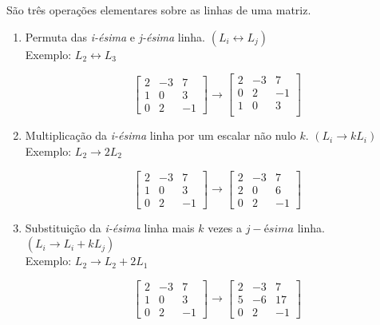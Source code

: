 \documentclass[oneside,a4paper,12pt]{article}
\begin{document}
São três operações elementares sobre as linhas de uma matriz.
\begin{enumerate}
	\item Permuta das {\it i-ésima} e {\it j-ésima} linha. $(L_i \leftrightarrow L_j)$ \\
	Exemplo:
	$L_2 \leftrightarrow L_3$
	
	$$\left[
	\begin{array}{ccc}
	2	&	-3	&	7	\\
	1	&	0	&	3	\\
	0	&	2	&	-1
	\end{array}
	\right]
	\rightarrow
	\left[
	\begin{array}{ccc}
	2	&	-3	&	7	\\
	0	&	2	&	-1	\\
	1	&	0	&	3	\\
	\end{array}
	\right]
	$$

	\item Multiplicação da {\it i-ésima} linha por um escalar não nulo $k$. $(L_i \rightarrow kL_i)$ \\
	Exemplo:
	$L_2 \rightarrow 2L_2$
	
	$$\left[
	\begin{array}{ccc}
	2	&	-3	&	7	\\
	1	&	0	&	3	\\
	0	&	2	&	-1
	\end{array}
	\right]
	\rightarrow
	\left[
	\begin{array}{ccc}
	2	&	-3	&	7	\\
	2	&	0	&	6	\\
	0	&	2	&	-1
	\end{array}
	\right]
	$$
	
	\item Substituição da {\it i-ésima} linha mais $k$ vezes a $j-ésima$ linha. $(L_i \rightarrow L_i + kL_j)$ \\
	Exemplo:
	$L_2 \rightarrow L_2 + 2L_1$
	
	$$\left[
	\begin{array}{ccc}
	2	&	-3	&	7	\\
	1	&	0	&	3	\\
	0	&	2	&	-1
	\end{array}
	\right]
	\rightarrow
	\left[
	\begin{array}{ccc}
	2	&	-3	&	7	\\
	5	&	-6	&	17	\\
	0	&	2	&	-1
	\end{array}
	\right]
	$$
\end{enumerate}
\end{document}
